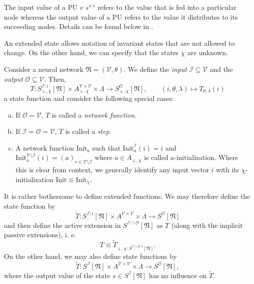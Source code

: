 \documentclass[a4paper,11pt]{report}
\newcommand{\const}{\varsigma} %
\newcommand{\var}{\chi} %
\newcommand{\In}{\text{Init}}
\begin{document}
\begin{Par}
The input value of a PU $v$ $s^{v:i}$ refers to the value that is fed into a particular node whereas the output value of a PU refers to the value it distributes to its succeeding nodes. Details can be found below in .
\end{Par}

\begin{Par}
An extended state allows notation of invariant states that are not allowed to change. On the other hand, we can specify that the states $\var$ are unknown.
\end{Par}

\begin{Def}
Consider a neural network $\mathfrak{N}=(\mathcal{V},\theta)$. We define the \emph{input} $\mathcal{I}\subseteq\mathcal{V}$ and the \emph{output} $\mathcal{O}\subseteq\mathcal{V}$. Then, 
\begin{equation}\label{eq:state-function}
T:S_{\const,\var}^{\mathcal{I}:i}[\mathfrak{N}]\times A_{\const,\var}^{\mathcal{V}\times\mathcal{V}}\times\Lambda\to S^{\mathcal{O}}_{\const,\var}[\mathfrak{N}],\qquad 
(i,\theta,\lambda)\mapsto T_{\theta,\lambda}(i)
\end{equation}
a state function and consider the following special cases:
\begin{enumerate}[a)]
\item
If $\mathcal{O}=\mathcal{V}$, $T$ is called a \emph{network function}.
\item
If $\mathcal{I}=\mathcal{O}=\mathcal{V}$, $T$ is called a \emph{step}.
\item
A network function $\In_a$ such that $\In_a^{\mathcal{I}}(i)=i$ and $\In_a^{\mathcal{V}\setminus\mathcal{I}}(i)=\left(a\right)_{v\in\mathcal{V}\setminus\mathcal{I}}$ where $a\in A_{\const,\var}$ is called $a$-initialization. Where this is clear from context, we generally identify any input vector $i$ with its $\var$-initialization $\In\equiv\In_{\var}$.
\end{enumerate}
\end{Def}

\begin{Not}
It is rather bothersome to define extended functions. We may therefore define the state function by 
\[
\tilde{T}:S^{\mathcal{I}:i}[\mathfrak{N}]\times A^{\mathcal{V}\times\mathcal{V}}\times\Lambda\to S^{\mathcal{O}}[\mathfrak{N}]
\]
and then define the active extension in $S^{\mathcal{I}\cap\mathcal{O}}[\mathfrak{N}]$ as $T$ (along with the implicit passive extensions), i. e.
\begin{equation}
T\equiv\tilde{T}_{\const,\var:S^{\mathcal{I}\cap\mathcal{O}:i}[\mathfrak{N}]}.
\end{equation}
On the other hand, we may also define state functions by
\[
\tilde{T}:S^{\mathcal{I}}[\mathfrak{N}]\times A^{\mathcal{V}\times\mathcal{V}}\times\Lambda\to S^{\mathcal{O}}[\mathfrak{N}],
\]
where the output value of the state $s\in S^{\mathcal{I}}[\mathfrak{N}]$ has no influence on $\tilde{T}$.
\end{Not}
\end{document}
